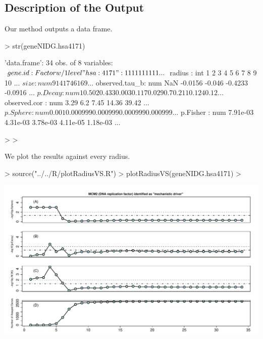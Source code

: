 \documentclass[11pt]{article}
\begin{document}
\subsection*{Description of the Output} %



Our method outputs a data frame. 


\begin{Schunk}
\begin{Sinput}
> str(geneNIDG.hsa4171)
\end{Sinput}
\begin{Soutput}
'data.frame':	34 obs. of  8 variables:
 $ gene.id       : Factor w/ 1 level "hsa:4171": 1 1 1 1 1 1 1 1 1 1 ...
 $ radius        : int  1 2 3 4 5 6 7 8 9 10 ...
 $ size          : num  9 14 17 46 169 ...
 $ observed.tau_b: num  NaN -0.0156 -0.046 -0.4233 -0.0916 ...
 $ p.Decay       : num  1 0.502 0.433 0.003 0.117 0.029 0.7 0.211 0.124 0.12 ...
 $ observed.cor  : num  3.29 6.2 7.45 14.36 39.42 ...
 $ p.Sphere      : num  0.001 0.000999 0.000999 0.000999 0.000999 ...
 $ p.Fisher      : num  7.91e-03 4.31e-03 3.78e-03 4.11e-05 1.18e-03 ...
\end{Soutput}
\begin{Sinput}
> 
> 
\end{Sinput}
\end{Schunk}


We plot the results against every radius.

\begin{Schunk}
\begin{Sinput}
> source("../../R/plotRadiusVS.R")
> plotRadiusVS(geneNIDG.hsa4171)
> 
\end{Sinput}
\end{Schunk}
\includegraphics{vignette-main-010}
\end{document}
